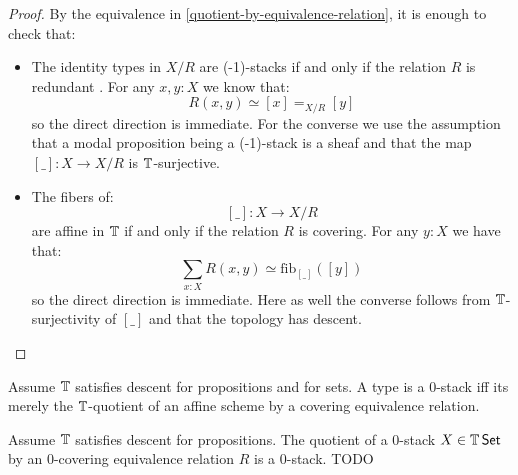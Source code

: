 \begin{proof}
	By the equivalence in \ref{quotient-by-equivalence-relation}, it is enough to check that:
	\begin{itemize}
		\item The identity types in $X/R$ are 
		(-1)-stacks if and only if the relation $R$ is redundant . For any $x,y:X$ we know that:
		\[R(x,y) \simeq [x] =_{X/R}[y]\]
		so the direct direction is immediate. For the converse we use the assumption that a modal proposition being a  (-1)-stack is a sheaf and that the map $[\_]:X\to X/R$ is $\mathbb{T}$-surjective.
		\item The fibers of: 
		\[[\_]:X\to X/R\] 
		are affine in $\mathbb{T}$ if and only if the relation $R$ is covering. For any $y:X$ we have that:
		\[\sum_{x:X} R(x,y) \simeq \mathrm{fib}_{[\_]}([y])\]
		so the direct direction is immediate. Here as well the converse follows from $\mathbb{T}$-surjectivity of $[\_]$ and that the topology has descent.
	\end{itemize}
\end{proof}
\begin{corollary}
	Assume $\mathbb{T}$ satisfies descent for propositions and for sets.
	A type is a  0-stack iff its merely the $\mathbb{T}$-quotient of an affine scheme by a covering equivalence relation.
\end{corollary}
\begin{theorem}{\label{thm:QuotientOfAlgebraicSpace}}
	Assume $\mathbb{T}$ satisfies descent for propositions. 
	The quotient of a  $0$-stack $X \in \mathbb{T} \operatorname{\mathsf {Set}}$ by an $0$-covering equivalence relation $R$ is a  $0$-stack. TODO
\end{theorem}

